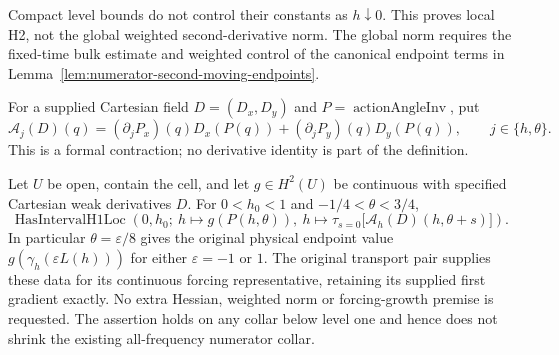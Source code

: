 \begin{remark}
Compact level bounds do not control their constants as $h\downarrow0$.
This proves local H2, not the global weighted second-derivative norm.
The global norm requires the fixed-time bulk estimate and weighted control
of the canonical endpoint terms in Lemma~\ref{lem:numerator-second-moving-endpoints}.
\end{remark}

\begin{definition}
\label{def:action-angle-pullback-gradient}
\leanok
For a supplied Cartesian field $D=(D_x,D_y)$ and $P=\operatorname{actionAngleInv}$,
put
\[
 \mathcal A_j(D)(q)=
   (\partial_jP_x)(q)D_x(P(q))+(\partial_jP_y)(q)D_y(P(q)),
 \qquad j\in\{h,\theta\}.
\]
This is a formal contraction; no derivative identity is part of the definition.
\end{definition}

\begin{lemma}
\label{lem:orbit-tangential-trace}
\leanok
Let $U$ be open, contain the cell, and let $g\in H^2(U)$ be continuous
with specified Cartesian weak derivatives $D$.
For $0<h_0<1$ and $-1/4<\theta<3/4$,
\[
 \operatorname{HasIntervalH1Loc}\left(0,h_0;\
 h\mapsto g(P(h,\theta)),\
 h\mapsto\tau_{s=0}\bigl[\mathcal A_h(D)(h,\theta+s)\bigr]\right).
\]
In particular $\theta=\varepsilon/8$ gives the original physical endpoint
value $g(\gamma_h(\varepsilon L(h)))$ for either $\varepsilon=-1$ or $1$.
The original transport pair supplies these data for its continuous forcing
representative, retaining its supplied first gradient exactly.
No extra Hessian, weighted norm or forcing-growth premise is requested.
The assertion holds on any collar below level one and hence does not shrink
the existing all-frequency numerator collar.
\end{lemma}

